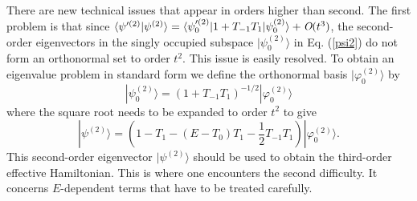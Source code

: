 \documentclass[floatfix,twocolumn,aps,prb,showpacs,superscriptaddress]{revtex4}
\begin{document}
There are new technical issues that appear in orders higher than second. The
first problem is that since $\langle \psi ^{\prime (2)}|\psi ^{(2)}\rangle
=\langle \psi _{0}^{\prime (2)}|1+T_{-1}T_{1}|\psi _{0}^{(2)}\rangle +\emph{O%
}(t^{3})$, the second-order eigenvectors in the singly occupied subspace $%
|\psi _{0}^{(2)}\rangle $ in Eq. (\ref{psi2}) do not form an orthonormal set
to order $t^{2}$. This issue is easily resolved. To obtain an eigenvalue
problem in standard form we define the orthonormal basis $|\varphi
_{0}^{(2)}\rangle $ by 
\begin{equation}
|\psi _{0}^{(2)}\rangle =\left( 1+T_{-1}T_{1}\right) ^{-1/2}|\varphi
_{0}^{(2)}\rangle   \label{phi2}
\end{equation}%
where the square root needs to be expanded to order $t^{2}$ to give 
\begin{equation}
|\psi ^{(2)}\rangle =\left( 1-T_{1}-(E-T_{0})T_{1}-\frac{1}{2}%
T_{-1}T_{1}\right) |\varphi _{0}^{(2)}\rangle .  \label{psi2normalized}
\end{equation}%
This second-order eigenvector $|\psi ^{(2)}\rangle $ should be used to
obtain the third-order effective Hamiltonian. This is where one encounters
the second difficulty. It concerns $E$-dependent terms that have to be
treated carefully.
\end{document}
